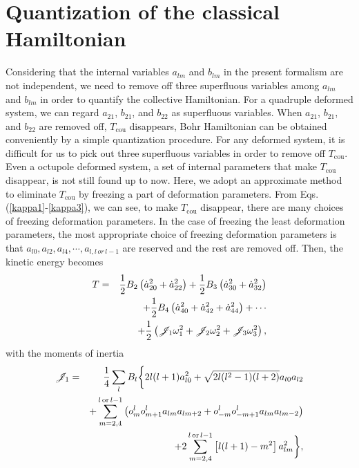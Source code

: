 \documentclass[twocolumn,prc,showpacs,preprintnumbers,superscriptaddress,floatfix]{revtex4}
\begin{document}
\section{Quantization of the classical Hamiltonian}

Considering that the internal variables $a_{lm}$ and $b_{lm}$ in the present
formalism are not independent, we need to remove off three superfluous
variables among $a_{lm}$ and $b_{lm}$ in order to quantify the collective
Hamiltonian. For a quadruple deformed system, we can regard $a_{21}$, $%
b_{21} $, and $b_{22}$ as superfluous variables. When $a_{21}$, $b_{21}$,
and $b_{22}$ are removed off, $T_{\text{cou}}$ disappears, Bohr Hamiltonian
can be obtained conveniently by a simple quantization procedure. For any
deformed system, it is difficult for us to pick out three superfluous
variables in order to remove off $T_{\text{cou}}$. Even a octupole deformed
system, a set of internal parameters that make $T_{\text{cou}}$ disappear,
is not still found up to now. Here, we adopt an approximate method to
eliminate $T_{\text{cou}}$ by freezing a part of deformation parameters.
From Eqs.(\ref{kappa1}-\ref{kappa3}), we can see, to make $T_{\text{cou}}$
disappear, there are many choices of freezing deformation parameters. In the
case of freezing the least deformation parameters, the most appropriate
choice of freezing deformation parameters is that $a_{l0},a_{l2},a_{l4},%
\cdots ,a_{l,l\,or\,l-1}$ are reserved and the rest are removed off. Then,
the kinetic energy becomes
\begin{eqnarray}
T &=&\frac{1}{2}B_{2}\left( \dot{a}_{20}^{2}+\dot{a}_{22}^{2}\right) +\frac{1%
}{2}B_{3}\left( \dot{a}_{30}^{2}+\dot{a}_{32}^{2}\right)  \notag \\
&&+\frac{1}{2}B_{4}\left( \dot{a}_{40}^{2}+\dot{a}_{42}^{2}+\dot{a}%
_{44}^{2}\right) +\cdots  \notag \\
&&+\frac{1}{2}\left( \mathscr{J}_{1}\omega _{1}^{2}+\mathscr{J}_{2}\omega
_{2}^{2}+\mathscr{J}_{3}\omega _{3}^{2}\right) ,
\end{eqnarray}%
with the moments of inertia
\begin{eqnarray}
\mathscr{J}_{1} &=&\frac{1}{4}\sum_{l}B_{l}\bigg\{2l(l+1)a_{l0}^{2}+\sqrt{%
2l(l^{2}-1)(l+2)}a_{l0}a_{l2}  \notag \\
&&+\sum_{m=2,4}^{l\,\text{or}\,l-1}\left(
o_{m}^{l}o_{m+1}^{l}a_{lm}a_{lm+2}+o_{-m}^{l}o_{-m+1}^{l}a_{lm}a_{lm-2}%
\right)  \notag \\
&&+2\sum_{m=2,4}^{l\,\text{or}\,l-1}\left[ l(l+1)-m^{2}\right] a_{lm}^{2}%
\bigg\},
\end{eqnarray}%
\end{document}
